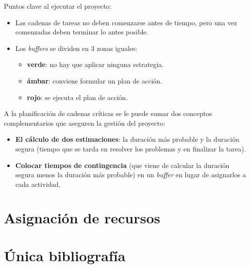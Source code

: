 \documentclass[12pt]{article}
\begin{document}
{Puntos clave al ejecutar el proyecto:}

\begin{itemize}
    \item {Las cadenas de tareas no deben comenzarse antes de tiempo, pero una vez comenzadas deben terminar lo antes posible.}
    \item {Los \textit{buffers} se dividen en 3 zonas iguales:}
    
    \begin{itemize}
        \item {\textbf{verde}: no hay que aplicar ninguna estrategia.}
        \item {\textbf{ámbar}: conviene formular un plan de acción.}
        \item {\textbf{rojo}: se ejecuta el plan de acción.}
    \end{itemize}
\end{itemize}

{A la planificación de cadenas críticas se le puede sumar dos conceptos complementarios que aseguren la gestión del proyecto:}

\begin{itemize}
    \item {\textbf{El cálculo de dos estimaciones}: la duración más probable y la duración segura (tiempo que se tarda en resolver los problemas y en finalizar la tarea).}
    \item {\textbf{Colocar tiempos de contingencia} (que viene de calcular la duración segura menos la duración más probable) en un \textit{buffer} en lugar de asignarlos a cada actividad.}
\end{itemize}


\newpage
\section{Asignación de recursos}
\label{8.0.0}


\newpage
\section{Única bibliografía}
\label{bibliografia}
\nocite{*}
\begingroup
\renewcommand{\section}[2]{}%
\printbibliography
\endgroup
\end{document}
